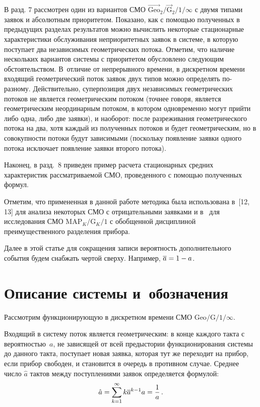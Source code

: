 \begin{multicols}{2}
В разд. 7 рассмотрен один из вариантов СМО
$\vec{\mbox{Geo}}_2/\vec {\mbox{G}}_2/1/\infty$ с двумя типами заявок и
абсолютным приоритетом.
Показано, как с по\-мощью по\-лу\-чен\-ных в предыдущих разделах
результатов \mbox{можно} вычислить некоторые стационарные
ха\-рак\-те\-ри\-стики обслуживания неприоритетных заявок в сис\-те\-ме,
в которую поступает два независимых гео\-мет\-ри\-че\-ских потока.
Отметим, что наличие нескольких вариантов системы с
приоритетом обуслов\-ле\-но следующим обстоятельством.
В~отличие от непрерывного времени, в дискретном времени
входящий геометрический поток заявок двух типов можно
определять по-раз\-но\-му.
Действительно, суперпозиция двух независимых геометрических
потоков не является геометрическим потоком (точнее говоря,
является геометрическим неординарным потоком, в котором
одновременно могут прийти либо одна, либо две заявки), и
наоборот: после разреживания геометрического потока на два,
хотя каждый из полученных потоков и будет гео\-мет\-ри\-че\-ским,
но в совокупности потоки будут зависимыми (поскольку
появление заявки одного потока исключает появление заявки
второго потока).
{

}

Наконец, в разд.~8 приведен пример расчета стационарных
средних характеристик рас\-смат\-ри\-ва\-емой СМО, проведенного с
помощью полученных формул.



Отметим, что примененная в данной работе методика была использована
в~[12, 13] для анализа некоторых СМО с отрицательными заявками
и в~\cite{A-M} для исследования СМО $\mbox{MAP}_K/\mbox{G}_K/1$ с обобщенной
дисциплиной преимущественного разделения прибора.



Далее в этой статье для сокращения записи ве\-ро\-ят\-ность
дополнительного события будем снабжать чертой сверху.
Например, $\overline a = 1-a$.



\section{Описание системы и~обозначения}

Рассмотрим функционирующую в дискретном времени СМО
$\mbox{Geo}/\mbox{G}/1/\infty$.

Входящий в систему поток является геометрическим:
в конце каждого такта с ве\-ро\-ят\-ностью~$a$, не зависящей от
всей предыстории функционирования сис\-те\-мы до данного такта,
поступает новая заявка, которая тут же переходит на прибор,
если прибор свободен, и становится в очередь в противном
случае.
Среднее число $\hat a$ тактов между поступлениями заявок
определяется формулой:
$$
\hat a = \sum\limits_{k=1}^{\infty}k \overline a^{k-1} a
= \displaystyle\frac{\displaystyle 1\mathstrut}{\displaystyle a\mathstrut}\,.
$$


\end{multicols}
